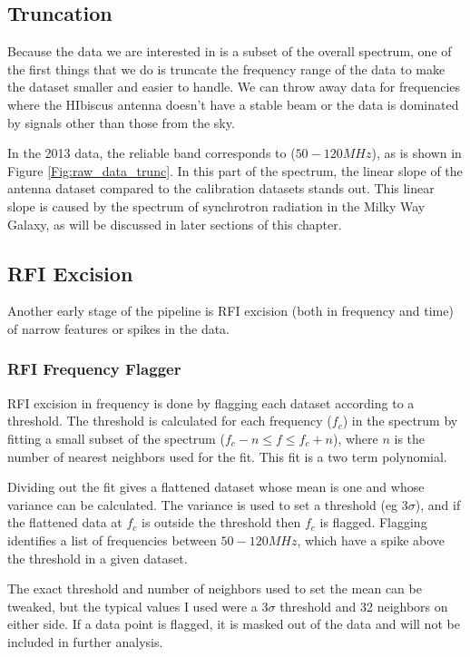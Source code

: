 \subsection{Truncation}

Because the data we are interested in is a subset of the overall spectrum, one of the first things that we do is truncate the frequency range of the data to make the dataset smaller and easier to handle. We can throw away data for frequencies where the HIbiscus antenna doesn't have a stable beam or the data is dominated by signals other than those from the sky. 

In the 2013 data, the reliable band corresponds to ($50-120 MHz$), as is shown in Figure \ref{Fig:raw_data_trunc}. In this part of the spectrum, the linear slope of the antenna dataset compared to the calibration datasets stands out. This linear slope is caused by the spectrum of synchrotron radiation in the Milky Way Galaxy, as will be discussed in later sections of this chapter. 


\subsection{RFI Excision}

Another early stage of the pipeline is RFI excision (both in frequency and time) of narrow features or spikes in the data. 

\subsubsection{RFI Frequency Flagger}

RFI excision in frequency is done by flagging each dataset according to a threshold. The threshold is calculated for each frequency ($f_c$) in the spectrum by fitting a small subset of the spectrum ($f_c-n \leq f \leq f_c + n$), where $n$ is the number of nearest neighbors used for the fit. This fit is a two term polynomial. 

Dividing out the fit gives a flattened dataset whose mean is one and whose variance can be calculated. The variance is used to set a threshold (eg $3 \sigma$), and if the flattened data at $f_c$ is outside the threshold then $f_c$ is flagged. Flagging identifies a list of frequencies between $50-120 MHz$, which have a spike above the threshold in a given dataset. 

The exact threshold and number of neighbors used to set the mean can be tweaked, but the typical values I used were a 3$\sigma$ threshold and 32 neighbors on either side. If a data point is flagged, it is masked out of the data and will not be included in further analysis.  

